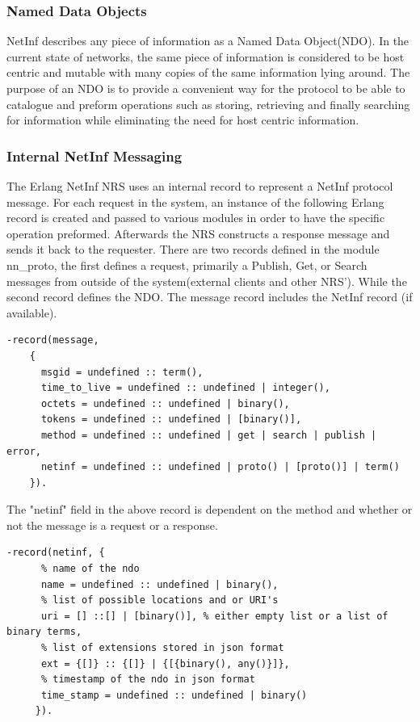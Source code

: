 \subsubsection{Named Data Objects}

NetInf describes any piece of information as a Named Data Object(NDO). In the current state of networks, the same piece of information is considered to be host centric and mutable with many copies of the same information lying around. The purpose of an NDO is to provide a convenient way for the protocol to be able to catalogue and preform operations such as storing, retrieving and finally searching for information while eliminating the need for host centric information.

\subsubsection{Internal NetInf Messaging}

The Erlang NetInf NRS uses an internal record to represent a NetInf protocol message. For each request in the system, an instance of the following Erlang record is created and passed to various modules in order to have the specific operation preformed. Afterwards the NRS constructs a response message and sends it back to the requester. There are two records defined in the module nn\_proto, the first defines a request, primarily a Publish, Get, or Search messages from outside of the system(external clients and other NRS'). While the second record defines the NDO. The message record includes the NetInf record (if available). 

\label{NDO-message}
\begin{verbatim}
-record(message, 
	{
	  msgid = undefined :: term(),
	  time_to_live = undefined :: undefined | integer(),
	  octets = undefined :: undefined | binary(),
	  tokens = undefined :: undefined | [binary()],
	  method = undefined :: undefined | get | search | publish | error,
	  netinf = undefined :: undefined | proto() | [proto()] | term()
	}).
\end{verbatim}

The "netinf" field in the above record is dependent on the method and whether or not the message is a request or a response.

\begin{verbatim}
-record(netinf, {
	  % name of the ndo
	  name = undefined :: undefined | binary(),
	  % list of possible locations and or URI's
	  uri = [] ::[] | [binary()], % either empty list or a list of binary terms,
	  % list of extensions stored in json format
	  ext = {[]} :: {[]} | {[{binary(), any()}]}, 
	  % timestamp of the ndo in json format
	  time_stamp = undefined :: undefined | binary() 
	 }).
\end{verbatim}

